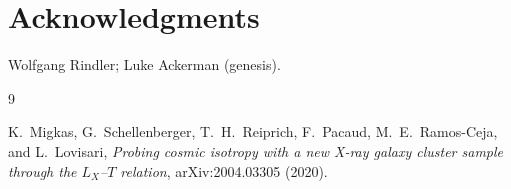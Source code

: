 \documentclass[11pt,letterpaper]{article}
\begin{document}
\begin{figure}[ht]
\centering
{}
\caption{}
\label{fig:add2}
\end{figure}

\section*{Acknowledgments}
Wolfgang Rindler; Luke Ackerman (genesis).

\begin{thebibliography}{9}

K.~Migkas, G.~Schellenberger, T.~H.~Reiprich, F.~Pacaud, M.~E.~Ramos-Ceja,
and L.~Lovisari,
\textit{Probing cosmic isotropy with a new X-ray galaxy cluster sample
through the $L_X$--$T$ relation},
arXiv:2004.03305 (2020).

\end{thebibliography}
\end{document}
